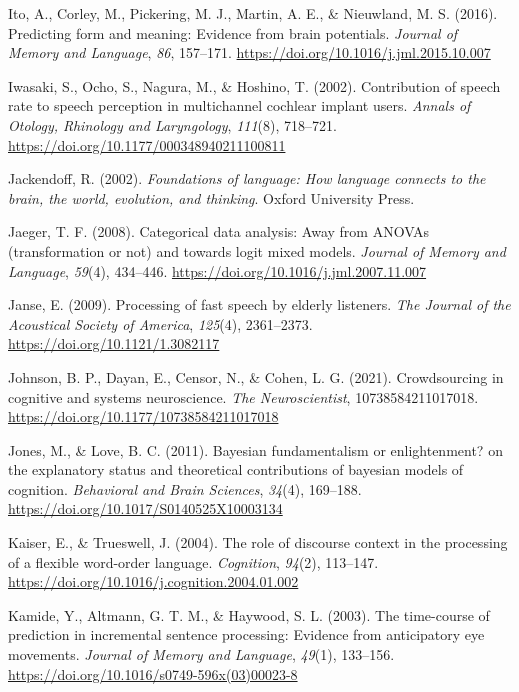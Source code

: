 \documentclass[a4paper, nobind]{templates/ociamthesis}
\newlength{\cslhangindent}
\newenvironment{CSLReferences}[2] %
 {%
  \setlength{\parindent}{0pt}
  \ifodd #1
  \let\oldpar\par
  \def\par{\hangindent=\cslhangindent\oldpar}
  \fi
  \setlength{\parskip}{1mm}
  \setlength{\baselineskip}{6mm}
 }%
 {}
\begin{document}
\begin{CSLReferences}{1}{0}
\leavevmode{}%
Ito, A., Corley, M., Pickering, M. J., Martin, A. E., \& Nieuwland, M. S. (2016). {Predicting form and meaning: Evidence from brain potentials}. \emph{Journal of Memory and Language}, \emph{86}, 157--171. \url{https://doi.org/10.1016/j.jml.2015.10.007}

\leavevmode{}%
Iwasaki, S., Ocho, S., Nagura, M., \& Hoshino, T. (2002). {Contribution of speech rate to speech perception in multichannel cochlear implant users}. \emph{Annals of Otology, Rhinology and Laryngology}, \emph{111}(8), 718--721. \url{https://doi.org/10.1177/000348940211100811}

\leavevmode{}%
Jackendoff, R. (2002). \emph{Foundations of language: How language connects to the brain, the world, evolution, and thinking}. Oxford University Press.

\leavevmode{}%
Jaeger, T. F. (2008). {Categorical data analysis: Away from ANOVAs (transformation or not) and towards logit mixed models}. \emph{Journal of Memory and Language}, \emph{59}(4), 434--446. \url{https://doi.org/10.1016/j.jml.2007.11.007}

\leavevmode{}%
Janse, E. (2009). {Processing of fast speech by elderly listeners}. \emph{The Journal of the Acoustical Society of America}, \emph{125}(4), 2361--2373. \url{https://doi.org/10.1121/1.3082117}

\leavevmode{}%
Johnson, B. P., Dayan, E., Censor, N., \& Cohen, L. G. (2021). {Crowdsourcing in cognitive and systems neuroscience}. \emph{The Neuroscientist}, 10738584211017018. \url{https://doi.org/10.1177/10738584211017018}

\leavevmode{}%
Jones, M., \& Love, B. C. (2011). {Bayesian fundamentalism or enlightenment? on the explanatory status and theoretical contributions of bayesian models of cognition}. \emph{Behavioral and Brain Sciences}, \emph{34}(4), 169--188. \url{https://doi.org/10.1017/S0140525X10003134}

\leavevmode{}%
Kaiser, E., \& Trueswell, J. (2004). The role of discourse context in the processing of a flexible word-order language. \emph{Cognition}, \emph{94}(2), 113--147. \url{https://doi.org/10.1016/j.cognition.2004.01.002}

\leavevmode{}%
Kamide, Y., Altmann, G. T. M., \& Haywood, S. L. (2003). The time-course of prediction in incremental sentence processing: Evidence from anticipatory eye movements. \emph{Journal of Memory and Language}, \emph{49}(1), 133--156. \url{https://doi.org/10.1016/s0749-596x(03)00023-8}


\end{CSLReferences}
\end{document}
